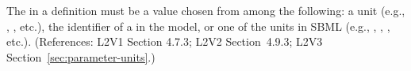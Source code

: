 The  in a \Parameter definition must be a value chosen from
among the following: a  unit (e.g., , ,
etc.), the identifier of a \UnitDefinition in the model, or one of the
 units in SBML (e.g., , , ,
etc.).  (References: L2V1 Section 4.7.3; L2V2 Section~4.9.3; L2V3
Section~\ref{sec:parameter-units}.)
